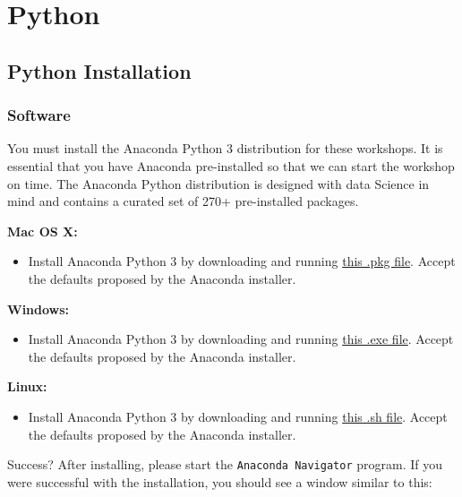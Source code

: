 \documentclass[]{book}
\providecommand{\tightlist}{%
  \setlength{\itemsep}{0pt}\setlength{\parskip}{0pt}}
\begin{document}
\hypertarget{part-python}{%
\part{Python}\label{part-python}}

\hypertarget{python-installation}{%
\chapter{Python Installation}\label{python-installation}}

\hypertarget{software-1}{%
\section{Software}\label{software-1}}

You must install the Anaconda Python 3 distribution for these workshops. It is essential that you have Anaconda pre-installed so that we can start the workshop on time. The Anaconda Python distribution is designed with data Science
in mind and contains a curated set of 270+ pre-installed packages.

\textbf{Mac OS X:}

\begin{itemize}
\tightlist
\item
  Install Anaconda Python 3 by downloading and running \href{https://repo.anaconda.com/archive/Anaconda3-2019.10-MacOSX-x86_64.pkg}{this .pkg file}. Accept the defaults proposed by the Anaconda installer.
\end{itemize}

\textbf{Windows:}

\begin{itemize}
\tightlist
\item
  Install Anaconda Python 3 by downloading and running \href{https://repo.anaconda.com/archive/Anaconda3-2019.10-Windows-x86_64.exe}{this .exe file}. Accept the defaults proposed by the Anaconda installer.
\end{itemize}

\textbf{Linux:}

\begin{itemize}
\tightlist
\item
  Install Anaconda Python 3 by downloading and running \href{https://repo.anaconda.com/archive/Anaconda3-2019.10-Linux-x86_64.sh}{this .sh file}. Accept the defaults proposed by the Anaconda installer.
\end{itemize}

Success? After installing, please start the \texttt{Anaconda\ Navigator} program. If you were successful with the installation, you should see a window similar to this:
\end{document}

